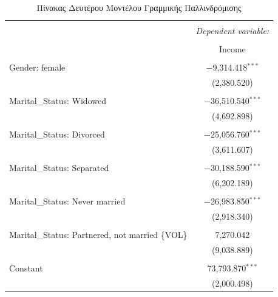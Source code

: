 \documentclass[10pt, letterpaper]{article}
\begin{document}
\begin{center}
\begin{figure}[h]
            \end{figure}
            \newpage
            \begin{table}[h] 
                \setlength\extrarowheight{-3pt}
                \caption{Πίνακας Δευτέρου Μοντέλου Γραμμικής Παλλινδρόμισης} 
                \label{model2table}
                \begin{tabular}{@{\extracolsep{5pt}}lc} 
                    \\[-1ex]\hline 
                    \hline \\[-1ex] 
                     & \multicolumn{1}{c}{\textit{Dependent variable:}} \\ 
                    \cline{2-2} 
                    \\[-1ex] & Income \\ 
                    \hline \\[-1.8ex] 
                     Gender: female & $-$9,314.418$^{***}$ \\ 
                      & (2,380.520) \\ 
                      & \\ 
                     Marital\_Status: Widowed & $-$36,510.540$^{***}$ \\ 
                      & (4,692.898) \\ 
                      & \\ 
                     Marital\_Status: Divorced & $-$25,056.760$^{***}$ \\ 
                      & (3,611.607) \\ 
                      & \\ 
                     Marital\_Status: Separated & $-$30,188.590$^{***}$ \\ 
                      & (6,202.189) \\ 
                      & \\ 
                     Marital\_Status: Never married & $-$26,983.850$^{***}$ \\ 
                      & (2,918.340) \\ 
                      & \\ 
                     Marital\_Status: Partnered, not married \{VOL\} & 7,270.042 \\ 
                      & (9,038.889) \\ 
                      & \\ 
                     Constant & 73,793.870$^{***}$ \\ 
                      & (2,000.498) \\ 

\end{tabular}
\end{table}
\end{center}
\end{document}
